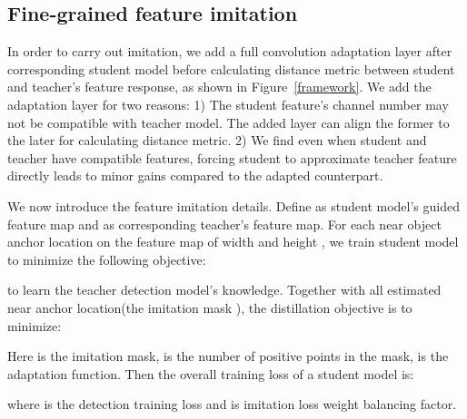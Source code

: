 \documentclass[10pt,twocolumn,letterpaper]{article}
\begin{document}
\subsection{Fine-grained feature imitation}

In order to carry out imitation, we add a full convolution adaptation layer after corresponding student model before calculating distance metric between student and teacher's feature response, as shown in Figure~\ref{framework}.  We add the adaptation layer for two reasons: 1) The student feature's channel number may not be compatible with teacher model. The added layer can align the former to the later for calculating distance metric. 2) We find even when student and teacher have compatible features, forcing student to approximate teacher feature directly leads to minor gains compared to the adapted counterpart.

We now introduce the feature imitation details. Define  as student model's guided feature map and   as corresponding teacher's feature map. For each near object anchor location  on the feature map of width  and height , we train student model to minimize  the following objective:

to learn the teacher detection model's knowledge. Together with all estimated near anchor location(the imitation mask ), the distillation objective is to minimize:

Here  is the imitation mask,  is the number of positive points in the mask,   is the adaptation function. Then the overall training loss of a student model is:

where  is the detection training loss and  is imitation loss weight balancing factor.
\end{document}

